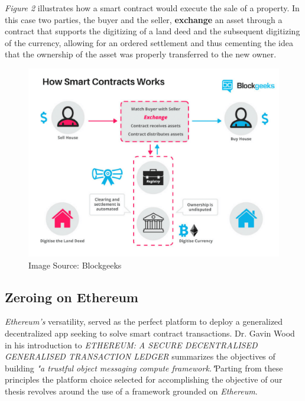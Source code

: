 \documentclass[submission,copyright,creativecommons]{eptcs}
\begin{document}
\textit{Figure 2} illustrates how a smart contract would execute the sale of a property.  In this case two parties, the buyer and the seller, \textbf{exchange} an asset through a contract that supports the digitizing of a land deed and the subsequent digitizing of the currency, allowing for an ordered settlement and thus cementing the idea that the ownership of the asset was properly transferred to the new owner\cite{WhatAreSmart}.
\begin{figure}[h]
    \centering
    \label{fig:howsmartcontractsworks}
    \includegraphics[width=5in]{How-Smart-Contracts-Works-1.png}
     \caption{Image Source: Blockgeeks}
\end{figure}

\subsection{Zeroing on Ethereum}
\textit{Ethereum's} versatility, served as the perfect platform to deploy a generalized decentralized app seeking to solve smart contract transactions.  Dr. Gavin Wood in his introduction to \textit{ETHEREUM: A SECURE DECENTRALISED GENERALISED TRANSACTION LEDGER} summarizes the objectives of building \textit{"a trustful object messaging compute framework."}\cite{wood2014ethereum}Parting from these principles the platform choice selected for accomplishing the objective of our thesis revolves around the use of a framework grounded on \textit{Ethereum}. 
\end{document}

